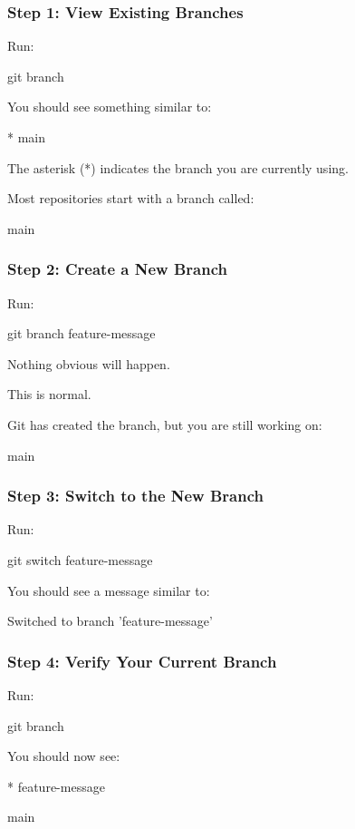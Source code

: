 \documentclass{csc2059practical}
\begin{document}
\subsubsection{Step 1: View Existing Branches}
Run:

\begin{terminalplain}
git branch
\end{terminalplain}
You should see something similar to:

* main

The asterisk (*) indicates the branch you are currently using.

Most repositories start with a branch called:

main

\subsubsection{Step 2: Create a New Branch}
Run:

\begin{terminalplain}
git branch feature-message
\end{terminalplain}
Nothing obvious will happen.

This is normal.

Git has created the branch, but you are still working on:

main

\subsubsection{Step 3: Switch to the New Branch}
Run:

\begin{terminalplain}
git switch feature-message
\end{terminalplain}
You should see a message similar to:

\begin{terminalplain}
Switched to branch 'feature-message'
\end{terminalplain}
\subsubsection{Step 4: Verify Your Current Branch}
Run:

\begin{terminalplain}
git branch
\end{terminalplain}
You should now see:

* feature-message

main
\end{document}
